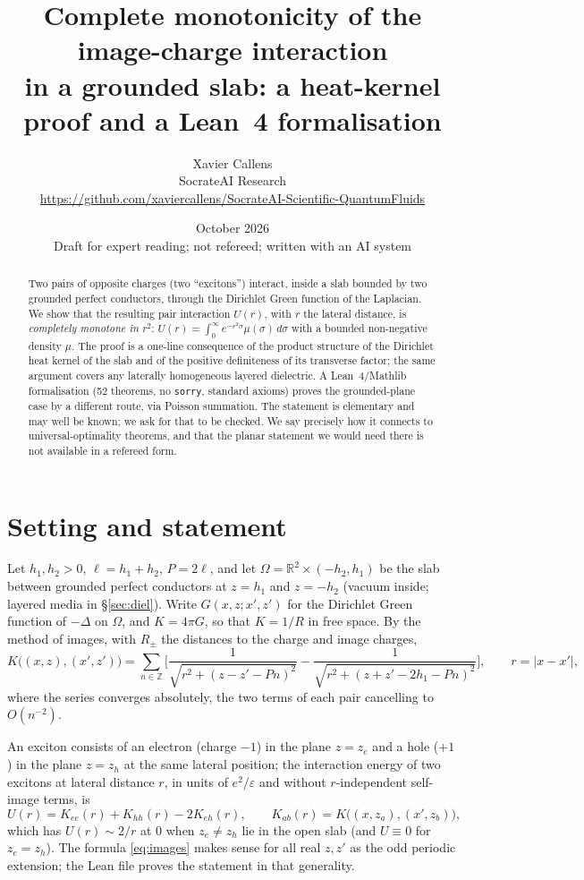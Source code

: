 \documentclass[11pt,a4paper]{article}
\title{\textbf{Complete monotonicity of the image-charge interaction\\ in a grounded slab:
a heat-kernel proof and a Lean~4 formalisation}}
\author{Xavier Callens\\ \small SocrateAI Research \\
\small \url{https://github.com/xaviercallens/SocrateAI-Scientific-QuantumFluids}}
\date{October 2026 \\ \small Draft for expert reading; not refereed; written with an AI system}
\theoremstyle{remark}
\newcommand{\R}{\mathbb{R}}
\newcommand{\Z}{\mathbb{Z}}
\begin{document}
\maketitle

\begin{abstract}\noindent
Two pairs of opposite charges (two ``excitons'') interact, inside a slab bounded by two grounded perfect conductors, through the
Dirichlet Green function of the Laplacian. We show that the resulting pair interaction $U(r)$, with $r$ the lateral distance, is
\emph{completely monotone in $r^2$}: $U(r)=\int_0^\infty e^{-r^2\sigma}\mu(\sigma)\,d\sigma$ with a bounded non-negative density
$\mu$. The proof is a one-line consequence of the product structure of the Dirichlet heat kernel of the slab and of the positive
definiteness of its transverse factor; the same argument covers any laterally homogeneous layered dielectric. A Lean~4/Mathlib
formalisation (52 theorems, no \texttt{sorry}, standard axioms) proves the grounded-plane case by a different route, via Poisson
summation. The statement is elementary and may well be known; we ask for that to be checked. We say precisely how it connects to
universal-optimality theorems, and that the planar statement we would need there is not available in a refereed form.
\end{abstract}

\section{Setting and statement}

Let $h_1,h_2>0$, $\ell=h_1+h_2$, $P=2\ell$, and let $\Omega=\R^2\times(-h_2,h_1)$ be the slab between grounded perfect conductors
at $z=h_1$ and $z=-h_2$ (vacuum inside; layered media in \S\ref{sec:diel}). Write $G(x,z;x',z')$ for the Dirichlet Green function of
$-\Delta$ on $\Omega$, and $K=4\pi G$, so that $K=1/R$ in free space. By the method of images, with $R_\pm$ the distances to the
charge and image charges,
\begin{equation}\label{eq:images}
K\big((x,z),(x',z')\big)=\sum_{n\in\Z}\Big[\frac1{\sqrt{r^2+(z-z'-Pn)^2}}-\frac1{\sqrt{r^2+(z+z'-2h_1-Pn)^2}}\Big],
\qquad r=|x-x'|,
\end{equation}
where the series converges absolutely, the two terms of each pair cancelling to $O(n^{-2})$.

An exciton consists of an electron (charge $-1$) in the plane $z=z_e$ and a hole ($+1$) in the plane $z=z_h$ at the same lateral
position; the interaction energy of two excitons at lateral distance $r$, in units of $e^2/\varepsilon$ and without
$r$-independent self-image terms, is
\begin{equation}\label{eq:U}
U(r)=K_{ee}(r)+K_{hh}(r)-2K_{eh}(r),\qquad K_{ab}(r)=K\big((x,z_a),(x',z_b)\big),
\end{equation}
which has $U(r)\sim 2/r$ at $0$ when $z_e\ne z_h$ lie in the open slab (and $U\equiv0$ for $z_e=z_h$). The formula \eqref{eq:images} makes sense
for all real $z,z'$ as the odd periodic extension; the Lean file proves the statement in that generality.
\end{document}
